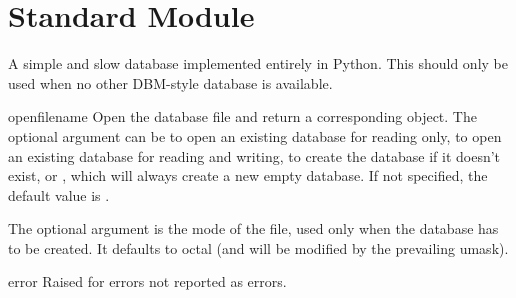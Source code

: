 \section{Standard Module }



A simple and slow database implemented entirely in Python.  This
should only be used when no other DBM-style database is available.


\begin{funcdesc}{open}{filename}
Open the database file  and return a corresponding object.
The optional  argument can be
 to open an existing database for reading only,
 to open an existing database for reading and writing,
 to create the database if it doesn't exist, or
, which will always create a new empty database.  If not
specified, the default value is .

The optional  argument is the \UNIX{} mode of the file, used
only when the database has to be created.  It defaults to octal
 (and will be modified by the prevailing umask).
\end{funcdesc}

\begin{excdesc}{error}
Raised for errors not reported as  errors.
\end{excdesc}
